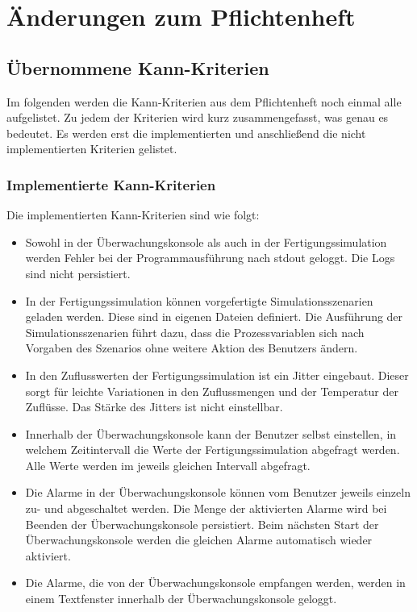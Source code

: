 \documentclass[parskip=full]{scrartcl}
\begin{document}
\pagebreak
\section{Änderungen zum Pflichtenheft}

\subsection{\"Ubernommene Kann-Kriterien}
Im folgenden werden die Kann-Kriterien aus dem Pflichtenheft noch einmal alle aufgelistet. Zu jedem der Kriterien wird
kurz zusammengefasst, was genau es bedeutet. Es werden erst die implementierten und anschlie{\ss}end die nicht implementierten
Kriterien gelistet.

\subsubsection{Implementierte Kann-Kriterien}
Die implementierten Kann-Kriterien sind wie folgt:

\begin{itemize}
    \item Sowohl in der \"Uberwachungskonsole als auch in der Fertigungssimulation werden Fehler bei der Programmausf\"uhrung
    nach stdout geloggt. Die Logs sind nicht persistiert.
    \item In der Fertigungssimulation k\"onnen vorgefertigte Simulationsszenarien geladen werden. Diese sind in eigenen Dateien definiert.
    Die Ausführung der Simulationsszenarien f\"uhrt dazu, dass die Prozessvariablen sich nach Vorgaben des Szenarios ohne
    weitere Aktion des Benutzers \"andern.
    \item In den Zuflusswerten der Fertigungssimulation ist ein Jitter eingebaut. Dieser sorgt f\"ur leichte Variationen in den
    Zuflussmengen und der Temperatur der Zufl\"usse. Das Stärke des Jitters ist nicht einstellbar.
    \item Innerhalb der \"Uberwachungskonsole kann der Benutzer selbst einstellen, in welchem Zeitintervall die Werte der
    Fertigungssimulation abgefragt werden. Alle Werte werden im jeweils gleichen Intervall abgefragt.
    \item Die Alarme in der \"Uberwachungskonsole k\"onnen vom Benutzer jeweils einzeln zu- und abgeschaltet werden. Die Menge der
    aktivierten Alarme wird bei Beenden der \"Uberwachungskonsole persistiert. Beim n\"achsten Start der \"Uberwachungskonsole
    werden die gleichen Alarme automatisch wieder aktiviert.
    \item Die Alarme, die von der \"Uberwachungskonsole empfangen werden, werden in einem Textfenster innerhalb der
    \"Uberwachungskonsole geloggt.
\end{itemize}
\end{document}
